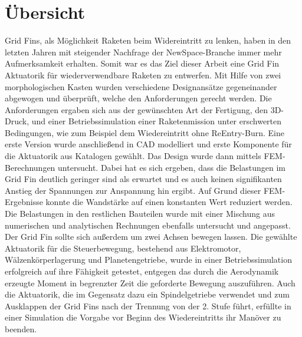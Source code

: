 \chapter*{Übersicht}
Grid Fins, als Möglichkeit Raketen beim Widereintritt zu lenken, haben in den letzten Jahren mit steigender Nachfrage der NewSpace-Branche immer mehr Aufmerksamkeit erhalten. Somit war es das Ziel dieser Arbeit eine Grid Fin Aktuatorik für wiederverwendbare Raketen zu entwerfen. Mit Hilfe von zwei morphologischen Kasten wurden verschiedene Designansätze gegeneinander abgewogen und überprüft, welche den Anforderungen gerecht werden. Die Anforderungen ergaben sich aus der gewünschten Art der Fertigung, den 3D-Druck, und einer Betriebssimulation einer Raketenmission unter erschwerten Bedingungen, wie zum Beispiel dem Wiedereintritt ohne ReEntry-Burn.  Eine erste Version wurde anschließend in CAD modelliert und erste Komponente für die Aktuatorik aus Katalogen gewählt. Das Design wurde dann mittels FEM-Berechnungen untersucht. Dabei hat es sich ergeben, dass die Belastungen im Grid Fin deutlich geringer sind als erwartet und es auch keinen signifikanten Anstieg der Spannungen zur Anspannung hin ergibt. Auf Grund dieser FEM-Ergebnisse konnte die Wandstärke auf einen konstanten Wert reduziert werden. Die Belastungen in den restlichen Bauteilen wurde mit einer Mischung aus numerischen und analytischen Rechnungen ebenfalls untersucht und angepasst. Der Grid Fin sollte sich außerdem um zwei Achsen bewegen lassen. Die gewählte Aktuatorik für die Steuerbewegung, bestehend aus Elektromotor, Wälzenkörperlagerung und Planetengetriebe, wurde in einer Betriebssimulation erfolgreich auf ihre Fähigkeit getestet, entgegen das durch die Aerodynamik erzeugte Moment in begrenzter Zeit die geforderte Bewegung auszuführen. Auch die Aktuatorik, die im Gegensatz dazu ein Spindelgetriebe verwendet und zum Ausklappen der Grid Fins nach der Trennung von der 2. Stufe führt, erfüllte in einer Simulation die Vorgabe vor Beginn des Wiedereintritts ihr Manöver zu beenden.